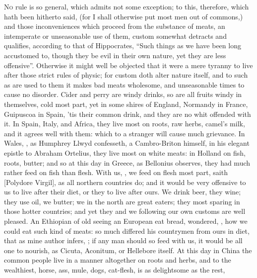 \lettrine{N}{o} rule is so general, which admits not some exception; to this,
therefore, which hath been hitherto said, (for I shall otherwise put most men
out of commons,) and those inconveniences which proceed from the substance of
meats, an intemperate or unseasonable use of them, custom somewhat detracts and
qualifies, according to that of Hippocrates,  \enquote{Such things as we have been long accustomed to,
though they be evil in their own nature, yet they are less offensive}.
Otherwise it might well be objected that it were a mere
tyranny to live after those strict rules of physic; for
custom doth alter nature itself, and to such as are used
to them it makes bad meats wholesome, and unseasonable times to cause no
disorder. Cider and perry are windy drinks, so are all fruits windy in
themselves, cold most part, yet in some shires of England,
Normandy in France, Guipuscoa in Spain, 'tis their common drink, and they are
no whit offended with it. In Spain, Italy, and Africa, they live most on roots,
raw herbs, camel's milk, and it agrees well with them:
which to a stranger will cause much grievance. In Wales, , as Humphrey Llwyd confesseth, a Cambro-Briton himself, in his
elegant epistle to Abraham Ortelius, they live most on white meats: in Holland
on fish, roots, butter; and so at this day in Greece, as
Bellonius observes, they had much rather feed on fish than
flesh. With us, , we feed on flesh
most part, saith [Polydore
Virgil], as all northern countries do; and it would be very offensive to us to
live after their diet, or they to live after ours. We drink beer, they wine;
they use oil, we butter; we in the north are great eaters;
they most sparing in those hotter countries; and yet they and we following our
own customs are well pleased. An Ethiopian of old seeing an European eat bread,
wondered, , how we could eat such
kind of meats: so much differed his countrymen from ours in diet, that as mine
author infers, ; if any man should so feed with us, it would be all one to
nourish, as Cicuta, Aconitum, or Hellebore itself. At this day in China the
common people live in a manner altogether on roots and herbs, and to the
wealthiest, horse, ass, mule, dogs, cat-flesh, is as delightsome as the rest,
